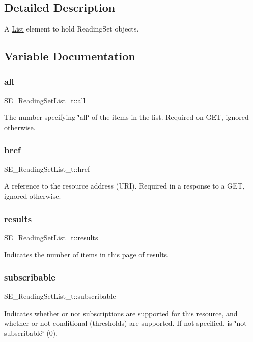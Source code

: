 \subsection{Detailed Description}
A \hyperlink{structList}{List} element to hold Reading\+Set objects. 

\subsection{Variable Documentation}
\mbox{\label{group__ReadingSetList_ga1994d11924fcf8fc6a97155fa178c76f}} 
\subsubsection{\texorpdfstring{all}{all}}
{\footnotesize\ttfamily S\+E\+\_\+\+Reading\+Set\+List\+\_\+t\+::all}

The number specifying \char`\"{}all\char`\"{} of the items in the list. Required on G\+ET, ignored otherwise. \mbox{\label{group__ReadingSetList_ga0070650a5263a076d3ce35b922fc53ea}} 
\subsubsection{\texorpdfstring{href}{href}}
{\footnotesize\ttfamily S\+E\+\_\+\+Reading\+Set\+List\+\_\+t\+::href}

A reference to the resource address (U\+RI). Required in a response to a G\+ET, ignored otherwise. \mbox{\label{group__ReadingSetList_gab43c330676fe1ada7052c94c529d7e29}} 
\subsubsection{\texorpdfstring{results}{results}}
{\footnotesize\ttfamily S\+E\+\_\+\+Reading\+Set\+List\+\_\+t\+::results}

Indicates the number of items in this page of results. \mbox{\label{group__ReadingSetList_ga95a98662b6838987c7eece397b81f7d2}} 
\subsubsection{\texorpdfstring{subscribable}{subscribable}}
{\footnotesize\ttfamily S\+E\+\_\+\+Reading\+Set\+List\+\_\+t\+::subscribable}

Indicates whether or not subscriptions are supported for this resource, and whether or not conditional (thresholds) are supported. If not specified, is \char`\"{}not subscribable\char`\"{} (0). 